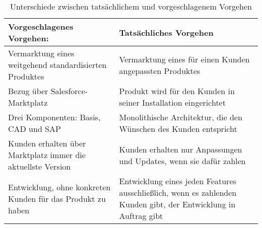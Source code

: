 \begin{table}[h]
\centering
\begin{tabular}{|p{}|p{}|}
\hline
\textbf{Vorgeschlagenes Vorgehen:} & \textbf{Tatsächliches Vorgehen} \\
\hline
Vermarktung eines weitgehend standardisierten Produktes & Vermarktung eines für 
einen Kunden angepassten Produktes \\
\hline
Bezug über Salesforce-Marktplatz & Produkt wird für den Kunden in 
seiner Installation eingerichtet \\
\hline
Drei Komponenten: Basis, CAD und SAP & Monolithische Architektur, die den 
Wünschen des Kunden entspricht \\
\hline
Kunden erhalten über Marktplatz immer die aktuellste Version & Kunden erhalten 
nur Anpassungen und Updates, wenn sie dafür zahlen \\
\hline
Entwicklung, ohne konkreten Kunden für das Produkt zu haben & Entwicklung 
eines jeden Features ausschließlich, wenn es zahlenden Kunden gibt, der 
Entwicklung in Auftrag gibt \\
\hline
\end{tabular}
\caption{Unterschiede zwischen tatsächlichem und vorgeschlagenem Vorgehen}
\label{tab:unterschiede_im_vorgehen}
\end{table}